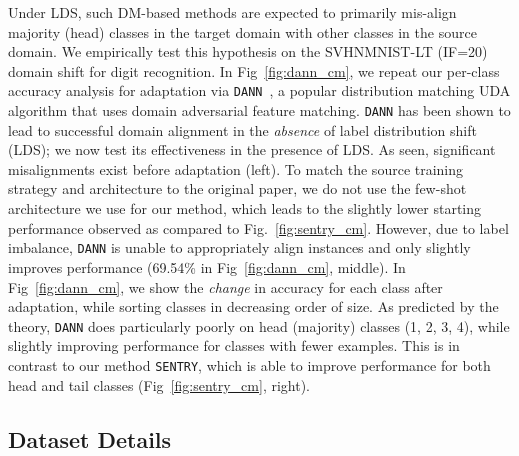 \documentclass[10pt,twocolumn,letterpaper]{article}
\newcommand{\method}{\texttt{SENTRY}\xspace}
\begin{document}
Under LDS, such DM-based methods are expected to primarily mis-align majority (head) classes in the target domain with other classes in the source domain. We empirically test this hypothesis on the SVHNMNIST-LT (IF=20) domain shift for digit recognition. In Fig~\ref{fig:dann_cm}, we repeat our per-class accuracy analysis for adaptation via \texttt{DANN}~\cite{ganin2014unsupervised}, a popular distribution matching UDA algorithm that uses domain adversarial feature matching. \texttt{DANN} has been shown to lead to successful domain alignment in the \emph{absence} of label distribution shift (LDS); we now test its effectiveness in the presence of LDS. As seen, significant misalignments exist before adaptation (left). To match the source training strategy and architecture to the original paper, we do not use the few-shot architecture we use for our method, which leads to the slightly lower starting performance observed as compared to Fig.~\ref{fig:sentry_cm}. However, due to label imbalance, \texttt{DANN} is unable to appropriately align instances and only slightly improves performance (69.54\% in Fig~\ref{fig:dann_cm}, middle). In Fig~\ref{fig:dann_cm}, we show the \emph{change} in accuracy for each class after adaptation, while sorting classes in decreasing order of size. As predicted by the theory, \texttt{DANN} does particularly poorly on head (majority) classes (1, 2, 3, 4), while slightly improving performance for classes with fewer examples. This is in contrast to our method \method, which is able to improve performance for both head and tail classes (Fig~\ref{fig:sentry_cm}, right).


\subsection{Dataset Details} 
\end{document}
